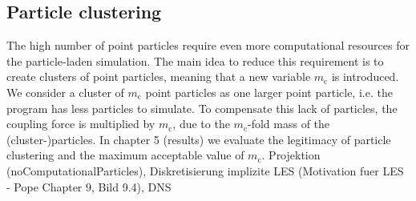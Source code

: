\documentclass[11pt,a4paper,openany,oneside,parskip=half*]{article}
\begin{document}
\subsection{Particle clustering}
The high number of point particles require even more computational resources for the particle-laden simulation. The main idea to reduce this requirement is to create clusters of point particles, meaning that a new variable $m_\mathrm{c}$ is introduced. We consider a cluster of $m_\mathrm{c}$ point particles as one larger point particle, i.e. the program has less particles to simulate. To compensate this lack of particles, the coupling force is multiplied by $m_\mathrm{c}$, due to the $m_\mathrm{c}$-fold mass of the (cluster-)particles. In chapter 5 (results) we evaluate the legitimacy of particle clustering and the maximum acceptable value of $m_\mathrm{c}$.
\newline
\newline
Projektion (noComputationalParticles), Diskretisierung
implizite LES (Motivation fuer LES -  Pope Chapter 9, Bild 9.4), DNS
\pagebreak
\end{document}
